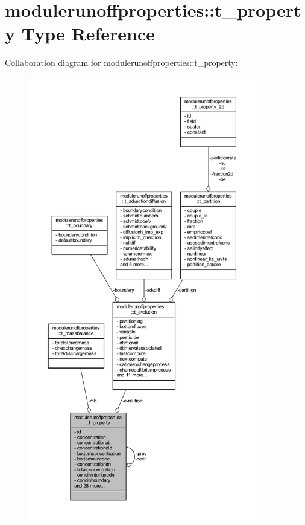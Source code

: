 \hypertarget{structmodulerunoffproperties_1_1t__property}{}\section{modulerunoffproperties\+:\+:t\+\_\+property Type Reference}
\label{structmodulerunoffproperties_1_1t__property}


Collaboration diagram for modulerunoffproperties\+:\+:t\+\_\+property\+:\nopagebreak
\begin{figure}[H]
\begin{center}
\leavevmode
\includegraphics[height=550pt]{structmodulerunoffproperties_1_1t__property__coll__graph}
\end{center}
\end{figure}
